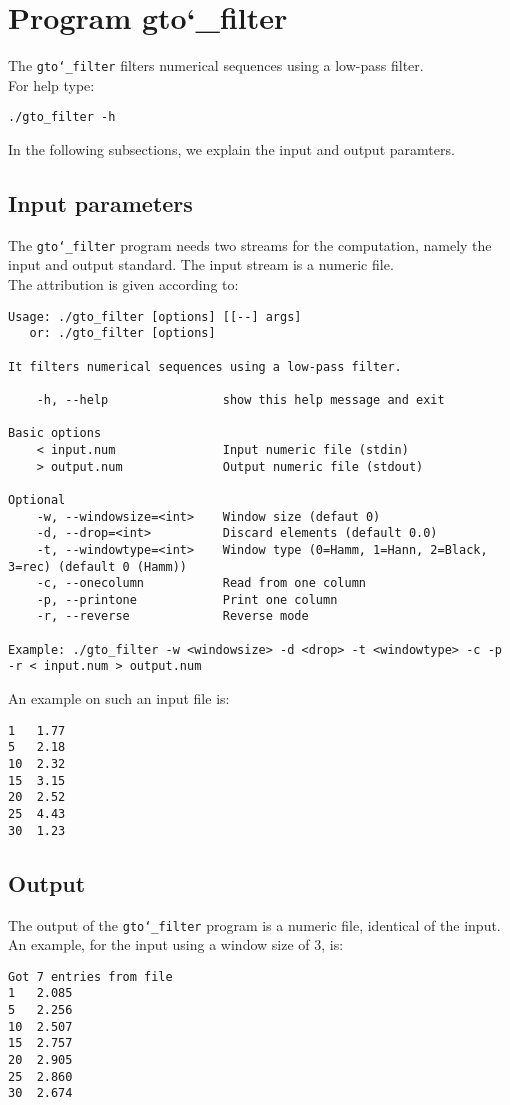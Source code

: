 \section{Program gto\char`_filter}
The \texttt{gto\char`_filter} filters numerical sequences using a low-pass filter.\\
For help type:
\begin{lstlisting}
./gto_filter -h
\end{lstlisting}
In the following subsections, we explain the input and output paramters.

\subsection*{Input parameters}

The \texttt{gto\char`_filter} program needs two streams for the computation, namely the input and output standard. The input stream is a numeric file.\\
The attribution is given according to:
\begin{lstlisting}
Usage: ./gto_filter [options] [[--] args]
   or: ./gto_filter [options]

It filters numerical sequences using a low-pass filter.

    -h, --help                show this help message and exit

Basic options
    < input.num               Input numeric file (stdin)
    > output.num              Output numeric file (stdout)

Optional
    -w, --windowsize=<int>    Window size (defaut 0)
    -d, --drop=<int>          Discard elements (default 0.0)
    -t, --windowtype=<int>    Window type (0=Hamm, 1=Hann, 2=Black, 3=rec) (default 0 (Hamm))
    -c, --onecolumn           Read from one column
    -p, --printone            Print one column
    -r, --reverse             Reverse mode

Example: ./gto_filter -w <windowsize> -d <drop> -t <windowtype> -c -p -r < input.num > output.num
\end{lstlisting}
An example on such an input file is:
\begin{lstlisting}
1   1.77
5   2.18
10  2.32
15  3.15
20  2.52
25  4.43
30  1.23
\end{lstlisting}

\subsection*{Output}
The output of the \texttt{gto\char`_filter} program is a numeric file, identical of the input.\\
An example, for the input using a window size of 3, is:
\begin{lstlisting}
Got 7 entries from file
1   2.085
5   2.256
10  2.507
15  2.757
20  2.905
25  2.860
30  2.674
\end{lstlisting}